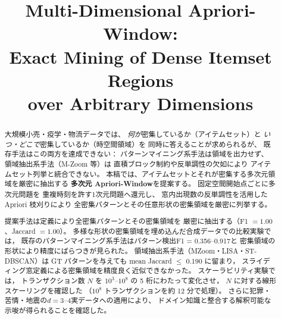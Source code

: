 \documentclass[conference]{IEEEtran}
\begin{document}
\title{Multi-Dimensional Apriori-Window: \\
Exact Mining of Dense Itemset Regions\\
over Arbitrary Dimensions}

\author{
  \and
}

\maketitle
\pagestyle{plain}

\begin{abstract}
大規模小売・疫学・物流データでは、
\emph{何が}密集しているか（アイテムセット）と
\emph{いつ・どこで}密集しているか（時空間領域）を
同時に答えることが求められるが、
既存手法はこの両方を達成できない：
パターンマイニング系手法は領域を出力せず、
領域抽出系手法（M-Zoom 等）は
直積ブロック制約や反単調性の欠如により
アイテムセット列挙と統合できない。
本稿では、アイテムセットとそれが密集する多次元領域を厳密に抽出する
\textbf{多次元 Apriori-Window}を提案する。
固定空間開始点ごとに多次元問題を
重複時刻を許す1次元問題へ還元し、
窓内出現数の反単調性を活用した Apriori 枝刈りにより
全密集パターンとその任意形状の密集領域を厳密に列挙する。

提案手法は定義により全密集パターンとその密集領域を
厳密に抽出する（F1 $= 1.00$、Jaccard $= 1.00$）。
多様な形状の密集領域を埋め込んだ合成データでの比較実験では，
既存のパターンマイニング系手法はパターン検出F1 = 0.356--0.917と
密集領域の形状により精度にばらつきが見られた。
領域抽出系手法（MZoom・LISA・ST-DBSCAN）は
GT パターンを与えても mean Jaccard $\leq$ 0.190 に留まり，
スライディング窓定義による密集領域を精度良く近似できなかった。
スケーラビリティ実験では，
トランザクション数 $N$ を $10^3$--$10^8$ の 5 桁にわたって変化させ，
$N$ に対する線形スケーリングを確認した
（$10^8$ トランザクションを約 12 分で処理）。
さらに犯罪・苦情・地震の$d{=}3$--$4$実データへの適用により、
ドメイン知識と整合する解釈可能な示唆が得られることを確認した。
\end{abstract}
\end{document}
